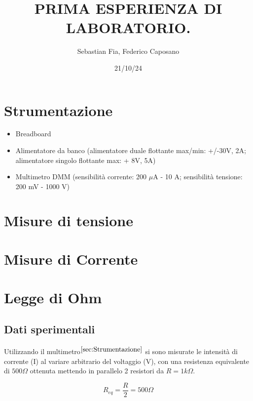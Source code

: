 \documentclass{article}
\title{PRIMA ESPERIENZA DI LABORATORIO.
}
\author{Sebastian Fia, Federico Caposano}
\date{21/10/24}
\begin{document}
	
	\maketitle   %
	
	\section{Strumentazione} \label{sec:Strumentazione}
	 	\begin{itemize} 
	 		\item Breadboard
	 		\item Alimentatore da banco (alimentatore duale flottante max/min: +/-30V, 2A; alimentatore singolo flottante max: + 8V, 5A)
	 		\item Multimetro DMM (sensibilità corrente: 200 $\mu$A - 10 A; sensibilità tensione: 200 mV - 1000 V)
	 	
	 	\end{itemize}
	
	\section{Misure di tensione} \label{sec:Tensione}
	\section{Misure di Corrente} \label{sec:Corrente}
	
	
	
	\section{Legge di Ohm} \label{sec:Ohm}
		\subsection{Dati sperimentali}
			\paragraph{}
				Utilizzando il multimetro$^{\ref{sec:Strumentazione}}$ si sono misurate le intensità di corrente (I) al variare arbitrario del voltaggio (V), con una resistenza equivalente di $500\Omega$ ottenuta mettendo in parallelo 2 resistori da $R=1k\Omega$.
				\begin{center}
					\begin{equation}\label{eq:Resistenza}
						R_{eq} = \frac{R}{2} = 500\Omega
					\end{equation}
				\end{center}
				
\end{document}
